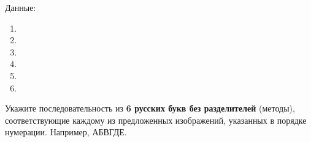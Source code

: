 Данные:
\begin{enumerate}
    \item
    \item
    \item
    \item
    \item
    \item
\end{enumerate}

Укажите последовательность из \textbf{6 русских букв без разделителей} (методы), соответствующие каждому из предложенных изображений, указанных в порядке нумерации. Например, АБВГДЕ.

